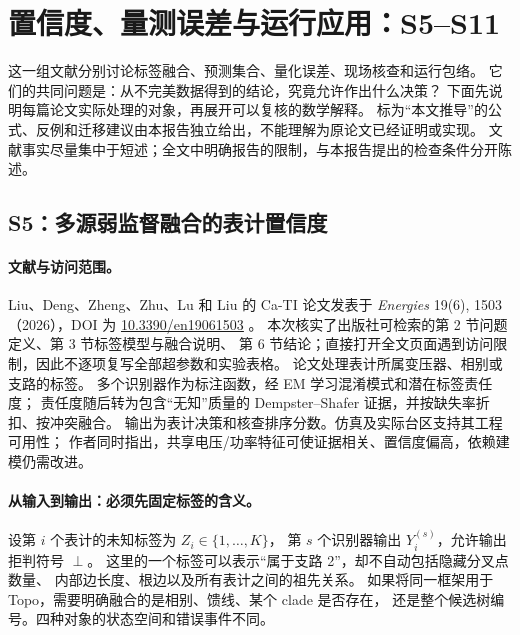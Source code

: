 \section{置信度、量测误差与运行应用：S5--S11}
\label{sec:engineering}

这一组文献分别讨论标签融合、预测集合、量化误差、现场核查和运行包络。
它们的共同问题是：从不完美数据得到的结论，究竟允许作出什么决策？
下面先说明每篇论文实际处理的对象，再展开可以复核的数学解释。
标为“本文推导”的公式、反例和迁移建议由本报告独立给出，不能理解为原论文已经证明或实现。
文献事实尽量集中于短述；全文中明确报告的限制，与本报告提出的检查条件分开陈述。

\subsection{S5：多源弱监督融合的表计置信度}
\label{subsec:S5}

\paragraph{文献与访问范围。}
Liu、Deng、Zheng、Zhu、Lu 和 Liu 的 Ca-TI 论文发表于
\emph{Energies} 19(6), 1503（2026），DOI 为
\href{https://doi.org/10.3390/en19061503}{10.3390/en19061503} \citep{S5}。
本次核实了出版社可检索的第 2 节问题定义、第 3 节标签模型与融合说明、
第 6 节结论；直接打开全文页面遇到访问限制，因此不逐项复写全部超参数和实验表格。
论文处理表计所属变压器、相别或支路的标签。
多个识别器作为标注函数，经 EM 学习混淆模式和潜在标签责任度；
责任度随后转为包含“无知”质量的 Dempster--Shafer 证据，并按缺失率折扣、按冲突融合。
输出为表计决策和核查排序分数。仿真及实际台区支持其工程可用性；
作者同时指出，共享电压/功率特征可使证据相关、置信度偏高，依赖建模仍需改进。

\paragraph{从输入到输出：必须先固定标签的含义。}
设第 $i$ 个表计的未知标签为 $Z_i\in\{1,\ldots,K\}$，
第 $s$ 个识别器输出 $Y_i^{(s)}$，允许输出拒判符号 $\perp$。
这里的一个标签可以表示“属于支路 2”，却不自动包括隐藏分叉点数量、
内部边长度、根边以及所有表计之间的祖先关系。
如果将同一框架用于 Topo，需要明确融合的是相别、馈线、某个 clade 是否存在，
还是整个候选树编号。四种对象的状态空间和错误事件不同。

